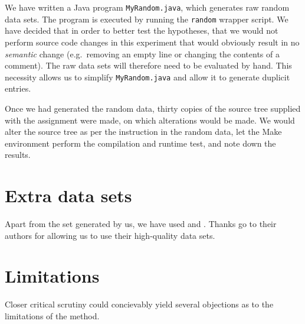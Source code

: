 \documentclass[10pt]{report}
\begin{document}
We have written a Java program {\tt MyRandom.java}, which generates raw random data sets.  The program is executed by running the {\tt random} wrapper script.
We have decided that in order to better test the hypotheses, that we would not perform source code changes in this experiment that would obviously result in no {\em semantic} change (e.g.~removing an empty line or changing the contents of a comment).  The raw data sets will therefore need to be evaluated by hand.  This necessity allows us to simplify {\tt MyRandom.java} and allow it to generate duplicit entries.

Once we had generated the random data, thirty copies of the source tree supplied with the assignment were made, on which alterations would be made.  We would alter the source tree as per the instruction in the random data, let the Make environment perform the compilation and runtime test, and note down the results.

\section{Extra data sets}

Apart from the set generated by us, we have used \cite{hoad} and \cite{nugee}.  Thanks go to their authors for allowing us to use their high-quality data sets.

\section{Limitations}

Closer critical scrutiny could concievably yield several objections as to the limitations of the method.
\end{document}
